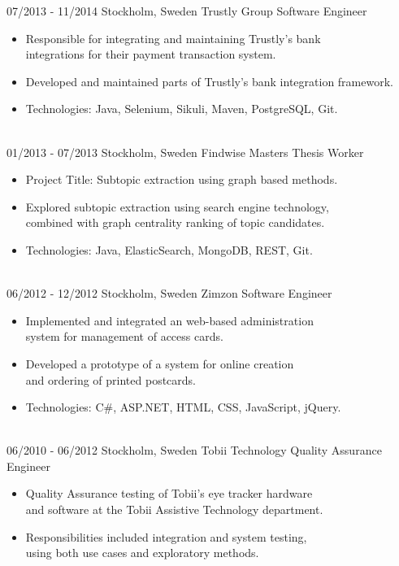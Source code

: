 \documentclass{markusos-cv}
\begin{document}
\begin{entrylist}
\entry
{07/2013 - 11/2014}
{Stockholm, Sweden}
{Trustly Group}
{Software Engineer} 
{
\begin{itemize}
\item  Responsible for integrating and maintaining Trustly's bank\\
 integrations for their payment transaction system.
\item  Developed and maintained parts of Trustly's bank integration framework.
\item  Technologies: Java, Selenium, Sikuli, Maven, PostgreSQL, Git.
\end{itemize}
}
\\%
\entry
{01/2013 - 07/2013}
{Stockholm, Sweden}
{Findwise}
{Masters Thesis Worker} 
{
\begin{itemize}
\item Project Title: Subtopic extraction using graph based methods.
\item Explored subtopic extraction using search engine technology,\\ combined with graph centrality ranking of topic candidates.
\item Technologies: Java, ElasticSearch, MongoDB, REST, Git.
\end{itemize} 
}
\\%
\entry
{06/2012 - 12/2012}
{Stockholm, Sweden}
{Zimzon}
{Software Engineer} 
{
\begin{itemize}
\item Implemented and integrated an web-based administration\\ system for management of access cards.
\item Developed a prototype of a system for online creation\\ and ordering of printed postcards.
\item Technologies: C\#, ASP.NET, HTML, CSS, JavaScript, jQuery.
\end{itemize} 
}
\\%
\entry
{06/2010 - 06/2012}
{Stockholm, Sweden}
{Tobii Technology}
{Quality Assurance Engineer} 
{
\begin{itemize}
\item Quality Assurance testing of Tobii's eye tracker hardware\\ and software at the Tobii Assistive Technology department.
\item Responsibilities included integration and system testing,\\ using both use cases and exploratory methods.
\end{itemize} 
}
\end{entrylist}
\end{document}
